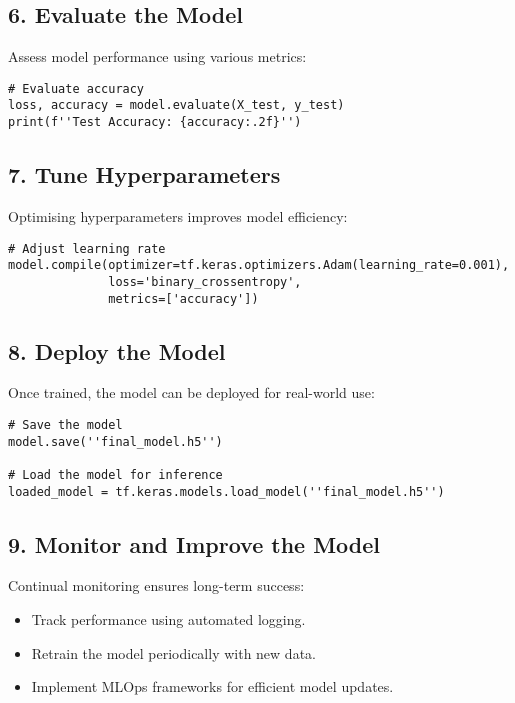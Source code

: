 \subsection{6. Evaluate the Model}

Assess model performance using various metrics:
\begin{verbatim}
# Evaluate accuracy
loss, accuracy = model.evaluate(X_test, y_test)
print(f''Test Accuracy: {accuracy:.2f}'')
\end{verbatim}

\subsection{7. Tune Hyperparameters}

Optimising hyperparameters improves model efficiency:
\begin{verbatim}
# Adjust learning rate
model.compile(optimizer=tf.keras.optimizers.Adam(learning_rate=0.001),
              loss='binary_crossentropy',
              metrics=['accuracy'])
\end{verbatim}

\subsection{8. Deploy the Model}

Once trained, the model can be deployed for real-world use:
\begin{verbatim}
# Save the model
model.save(''final_model.h5'')

# Load the model for inference
loaded_model = tf.keras.models.load_model(''final_model.h5'')
\end{verbatim}

\subsection{9. Monitor and Improve the Model}

Continual monitoring ensures long-term success:
\begin{itemize}
    \item Track performance using automated logging.
    \item Retrain the model periodically with new data.
    \item Implement MLOps frameworks for efficient model updates.
\end{itemize}

